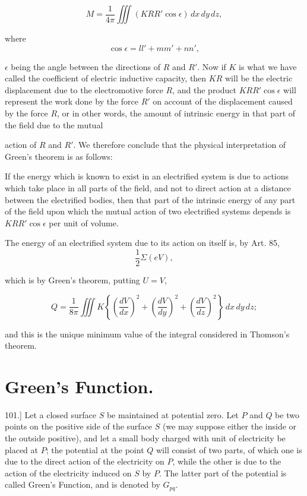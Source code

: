 \documentclass[11pt,a4paper]{article}
\begin{document}
\begin{equation}\tag{10}
M = \frac{1}{4\pi} \iiint (KRR'\cos\epsilon) \, dx \, dy \, dz,
\end{equation}

where
\[
\cos\epsilon = ll' + mm' + nn',
\]

$\epsilon$ being the angle between the directions of $R$ and $R'$. Now if $K$ is what we have called the coefficient of electric inductive capacity, then $KR$ will be the electric displacement due to the electromotive force $R$, and the product $KRR'\cos\epsilon$ will represent the work done by the force $R'$ on account of the displacement caused by the force $R$, or in other words, the amount of intrinsic energy in that part of the field due to the mutual

action of $R$ and $R'$. We therefore conclude that the physical interpretation of Green's theorem is as follows:

If the energy which is known to exist in an electrified system is due to actions which take place in all parts of the field, and not to direct action at a distance between the electrified bodies, then that part of the intrinsic energy of any part of the field upon which the mutual action of two electrified systems depends is $KRR'\cos\epsilon$ per unit of volume.

The energy of an electrified system due to its action on itself is, by Art. 85,
\[
\frac{1}{2}\Sigma(eV),
\]

which is by Green's theorem, putting $U=V$,

\begin{equation}\tag{11}
Q = \frac{1}{8\pi}\iiint K\left\{
\left(\frac{dV}{dx}\right)^2+
\left(\frac{dV}{dy}\right)^2+
\left(\frac{dV}{dz}\right)^2
\right\}\,dx\,dy\,dz;
\end{equation}

and this is the unique minimum value of the integral considered in Thomson's theorem.

\section*{Green's Function.}

101.] Let a closed surface $S$ be maintained at potential zero. Let $P$ and $Q$ be two points on the positive side of the surface $S$ (we may suppose either the inside or the outside positive), and let a small body charged with unit of electricity be placed at $P$; the potential at the point $Q$ will consist of two parts, of which one is due to the direct action of the electricity on $P$, while the other is due to the action of the electricity induced on $S$ by $P$. The latter part of the potential is called Green's Function, and is denoted by $G_{pq}$.
\end{document}
